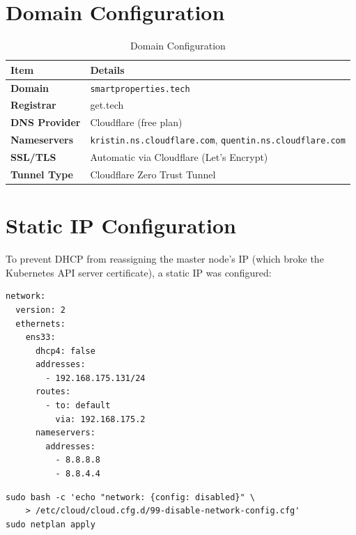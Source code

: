 \documentclass[12pt,a4paper]{report}
\begin{document}
\section{Domain Configuration}

\begin{table}[H]
  \centering
  \begin{tabular}{>{\bfseries}p{4cm} p{9cm}}
    \toprule
    \textbf{Item} & \textbf{Details} \\
    \midrule
    Domain & \texttt{smartproperties.tech} \\
    Registrar & get.tech \\
    DNS Provider & Cloudflare (free plan) \\
    Nameservers & \texttt{kristin.ns.cloudflare.com}, \texttt{quentin.ns.cloudflare.com} \\
    SSL/TLS & Automatic via Cloudflare (Let's Encrypt) \\
    Tunnel Type & Cloudflare Zero Trust Tunnel \\
    \bottomrule
  \end{tabular}
  \caption{Domain Configuration}
\end{table}

\section{Static IP Configuration}

To prevent DHCP from reassigning the master node's IP (which broke the Kubernetes API server certificate), a static IP was configured:

\begin{lstlisting}[style=yamlstyle, caption={/etc/netplan/50-cloud-init.yaml}]
network:
  version: 2
  ethernets:
    ens33:
      dhcp4: false
      addresses:
        - 192.168.175.131/24
      routes:
        - to: default
          via: 192.168.175.2
      nameservers:
        addresses:
          - 8.8.8.8
          - 8.8.4.4
\end{lstlisting}

\begin{lstlisting}[style=bashstyle, caption={Prevent cloud-init from overriding network config}]
sudo bash -c 'echo "network: {config: disabled}" \
    > /etc/cloud/cloud.cfg.d/99-disable-network-config.cfg'
sudo netplan apply
\end{lstlisting}

\end{document}
